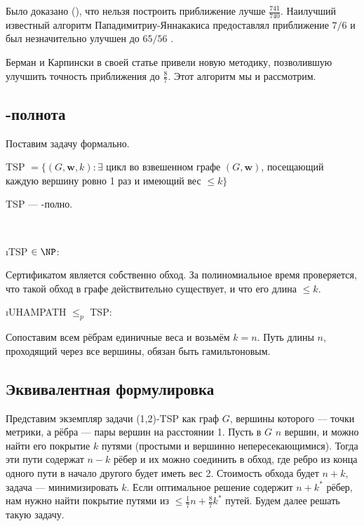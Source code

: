 Было доказано (\cite{EK01}), что нельзя построить приближение лучше $\frac{741}{740}$. Наилучший известный алгоритм Пападимитриу-Яннакакиса \cite{PY93} предоставлял приближение $7/6$ и был незначительно улучшен до $65/56$ \cite{BR05}. 

Берман и Карпински в своей статье \cite{BK06} привели новую методику, позволившую улучшить точность приближения до $\frac{8}{7}$. Этот алгоритм мы и рассмотрим.

\subsection{\NP-полнота}
Поставим задачу формально.

TSP $= \{ (G, \mathbf{w}, k): \exists$ цикл во взвешенном графе $(G, \mathbf{w})$, посещающий каждую вершину ровно 1 раз и имеющий вес $\le k \}$

\begin{theorem}
	TSP --- \NP-полно.
\end{theorem}
\begin{Proof}
 $ $
 
 \begin{itemize}
  \i TSP $\in \NP$\cite{BA09}:
 
  Сертификатом является собственно обход. За полиномиальное время проверяется, что такой обход в графе действительно существует, и что его длина $\le k$.
 
  \i UHAMPATH $\le_p$ TSP: \cite{M17}
 
  Сопоставим всем рёбрам единичные веса и возьмём $k = n$. Путь длины $n$, проходящий через все вершины, обязан быть гамильтоновым.
 \end{itemize}
\end{Proof}

\subsection{Эквивалентная формулировка}
Представим экземпляр задачи (1,2)-TSP как граф $G$, вершины которого --- точки метрики, а рёбра --- пары вершин на расстоянии 1. Пусть в $G$ $n$ вершин, и можно найти его покрытие $k$ путями (простыми и вершинно непересекающимися). Тогда эти пути содержат $n-k$ рёбер и их можно соединить в обход, где ребро из конца одного пути в начало другого будет иметь вес 2. Стоимость обхода будет $n+k$, задача --- минимизировать $k$. Если оптимальное решение содержит $n+k^*$ рёбер, нам нужно найти покрытие путями из $\le \frac{1}{7}n+\frac{8}{7}k^*$ путей. Будем далее решать такую задачу.

